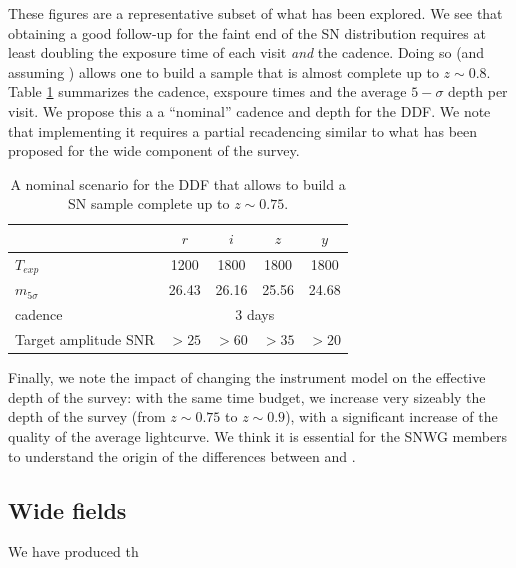 \documentclass[\docopts]{\docclass}
\begin{document}
These figures are a representative subset of what has been explored.
We see that obtaining a good follow-up for the faint end of the SN
distribution requires at least doubling the exposure time of each
visit {\em and} the cadence. Doing so (and assuming )
allows one to build a sample that is almost complete up to $z \sim
0.8$. Table \ref{tab:nominal_scenario_DDF} summarizes the cadence,
exspoure times and the average $5-\sigma$ depth per visit. We propose
this a a ``nominal'' cadence and depth for the DDF. We note that
implementing it requires a partial recadencing similar to what has
been proposed for the wide component of the survey.

\begin{table}
\begin{center}
\caption{A nominal scenario for the DDF that allows to build a SN
  sample complete up to $z \sim 0.75$.}
\label{tab:nominal_scenario_DDF}
\begin{tabular}{l|cccc}
\hline
\hline
              & $r$ & $i$ & $z$ & $y$ \\
\hline 
$T_{exp}$      & 1200 & 1800 & 1800 & 1800 \\
$m_{5\sigma}$  & 26.43    & 26.16    &  25.56    &  24.68   \\
cadence       &  \multicolumn{4}{c}{3 days} \\
Target amplitude SNR & $>25$ & $>60$ & $>35$ & $>20$ \\
\hline
\end{tabular}
\end{center}
\end{table}

Finally, we note the impact of changing the instrument model on the
effective depth of the survey: with the same time budget, we increase
very sizeably the depth of the survey (from $z \sim 0.75$ to $z\sim
0.9$), with a significant increase of the quality of the average
lightcurve.  We think it is essential for the SNWG members to
understand the origin of the differences between \cite{LSE-40} and
\cite{SMTN-002}.


\subsection{Wide fields}

We have produced th 
\end{document}
